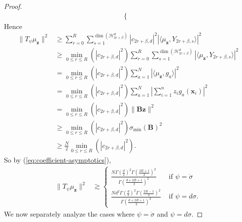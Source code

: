 \documentclass{article}
\theoremstyle{definition}
\newcommand{\mc}{\mathcal}
\def\vx{{\bm{x}}}
\def\vz{{\bm{z}}}
\def\mB{{\bm{B}}}
\begin{document}
\begin{proof}
\begin{align}
\begin{cases}
        \end{cases}
    \end{align}
    Hence
    \begin{align*}
        \|T_{\psi}\mu_{\vz}\|^2 &\geq \sum_{r = 0}^R \sum_{s = 1}^{\dim\left(\mc{H}_{2r + \beta}^d\right) }|c_{2r + \beta, d}|^2 |\langle \mu_{\vz}, Y_{2r + \beta, s} \rangle|^2\\
        &\geq \min_{0 \leq r \leq R}\left(|c_{2r + \beta, d}|^2 \right)\sum_{r = 0}^R \sum_{s = 1}^{\dim\left(\mc{H}_{2r + \beta}^d\right)}|\langle \mu_{\vz}, Y_{2r + \beta, s} \rangle|^2\\
        &= \min_{0 \leq r \leq R}\left(|c_{2r + \beta, d}|^2 \right)\sum_{a = 1}^N |\langle \mu_{\vz}, g_a \rangle|^2\\
        &= \min_{0 \leq r \leq R}\left(|c_{2r + \beta, d}|^2 \right)\sum_{a = 1}^N \left|\sum_{i = 1}^n z_i g_a(\vx_i) \right|^2\\
        &= \min_{0 \leq r \leq R}\left(|c_{2r + \beta, d}|^2 \right) \|\mB \vz\|^2\\
        &\geq \min_{0 \leq r \leq R}\left(|c_{2r + \beta, d}|^2 \right)\sigma_{\min}(\mB)^2\\
        &\geq \frac{N}{2}\min_{0 \leq r \leq R}\left(|c_{2r + \beta, d}|^2 \right).
    \end{align*}
    So by (\ref{eq:coefficient-asymptotics}),
    \begin{align}
        \|T_{\psi}\mu_{\vz}\|^2 &\gtrsim \begin{cases}
           \frac{N\Gamma\left(\frac{d}{2}\right)^2\Gamma\left(\frac{2R + 1}{2}\right)^2 }{\Gamma\left(\frac{d + 2R + 1}{2}\right)^2 } & \text{ if $\psi = \dot{\sigma}$}\\
           \frac{Nd^2\Gamma\left(\frac{d}{2}\right)^2\Gamma\left(\frac{2R - 1}{2}\right)^2 }{\Gamma\left(\frac{d + 2R + 1}{2}\right)^2 } & \text{ if $\psi = d\sigma$.}
        \end{cases}
    \end{align}
    We now separately analyze the cases where $\psi = \dot{\sigma}$ and $\psi = d\sigma$.


\end{proof}
\end{document}
